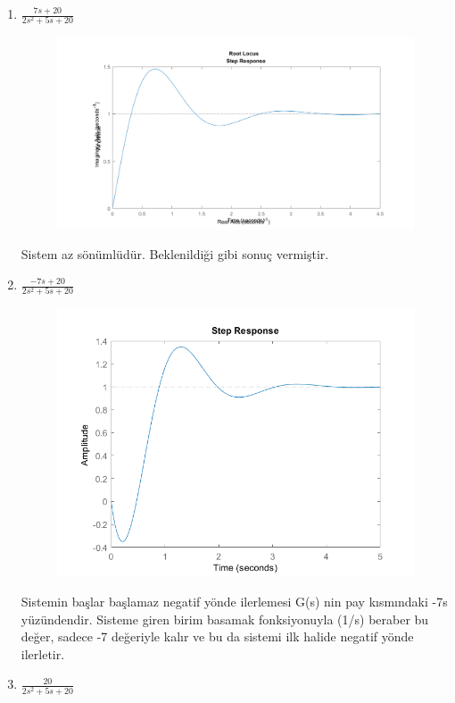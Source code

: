 \documentclass[a4paper,11pt]{article}
\begin{document}
\begin{enumerate}[label=\alph*)]
\item $\displaystyle\frac{7s + 20}{2s^2 + 5s + 20}$

\begin{figure}[h]
    \centering
    \includegraphics[width=.8\textwidth]{s1.png}
\end{figure}
Sistem az sönümlüdür. Beklenildiği gibi sonuç vermiştir.
\item $\displaystyle\frac{-7s+20}{2s^2 + 5s + 20}$

\begin{figure}[h]
    \centering
    \includegraphics[width=.8\textwidth]{s2.png}
\end{figure}
Sistemin başlar başlamaz negatif yönde ilerlemesi G(s) nin pay kısmındaki -7s yüzündendir. Sisteme giren birim basamak fonksiyonuyla (1/s) beraber bu değer, sadece -7 değeriyle kalır ve bu da sistemi ilk halide negatif yönde ilerletir.
\newpage\item $\displaystyle\frac{20}{2s^2 + 5s + 20}$


\end{enumerate}
\end{document}
